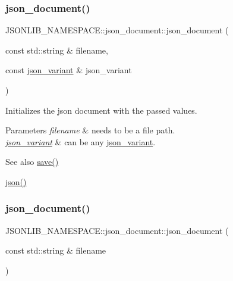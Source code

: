 \subsubsection{\texorpdfstring{json\+\_\+document()}{json\_document()}\hspace{0.1cm}{\footnotesize\ttfamily [4/6]}}
{\footnotesize\ttfamily J\+S\+O\+N\+L\+I\+B\+\_\+\+N\+A\+M\+E\+S\+P\+A\+C\+E\+::json\+\_\+document\+::json\+\_\+document (\begin{DoxyParamCaption}\item[{const std\+::string \&}]{filename,  }\item[{const \hyperlink{classJSONLIB__NAMESPACE_1_1json__variant}{json\+\_\+variant} \&}]{json\+\_\+variant }\end{DoxyParamCaption})}



Initializes the json document with the passed values. 


\begin{DoxyParams}{Parameters}
{\em filename} & needs to be a file path. \\
\hline
{\em \hyperlink{classJSONLIB__NAMESPACE_1_1json__variant}{json\+\_\+variant}} & can be any \hyperlink{classJSONLIB__NAMESPACE_1_1json__variant}{json\+\_\+variant}. \\
\hline
\end{DoxyParams}
\begin{DoxySeeAlso}{See also}
\hyperlink{classJSONLIB__NAMESPACE_1_1json__document_af8f392a0ffc779277ead1f2bdb222930}{save()} 

\hyperlink{classJSONLIB__NAMESPACE_1_1json__document_ad87b8e7d68ba854dbd730758273a3b93}{json()} 
\end{DoxySeeAlso}
\mbox{\label{classJSONLIB__NAMESPACE_1_1json__document_a3295c12f7251f1df5dc5f727a4e5b597}} 
\subsubsection{\texorpdfstring{json\+\_\+document()}{json\_document()}\hspace{0.1cm}{\footnotesize\ttfamily [5/6]}}
{\footnotesize\ttfamily J\+S\+O\+N\+L\+I\+B\+\_\+\+N\+A\+M\+E\+S\+P\+A\+C\+E\+::json\+\_\+document\+::json\+\_\+document (\begin{DoxyParamCaption}\item[{const std\+::string \&}]{filename }\end{DoxyParamCaption})}



